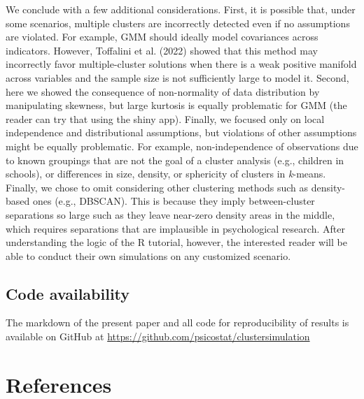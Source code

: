 \documentclass[
  man,floatsintext]{apa6}
\begin{document}
We conclude with a few additional considerations. First, it is possible that, under some scenarios, multiple clusters are incorrectly detected even if no assumptions are violated. For example, GMM should ideally model covariances across indicators. However, Toffalini et al. (2022) showed that this method may incorrectly favor multiple-cluster solutions when there is a weak positive manifold across variables and the sample size is not sufficiently large to model it. Second, here we showed the consequence of non-normality of data distribution by manipulating skewness, but large kurtosis is equally problematic for GMM (the reader can try that using the shiny app). Finally, we focused only on local independence and distributional assumptions, but violations of other assumptions might be equally problematic. For example, non-independence of observations due to known groupings that are not the goal of a cluster analysis (e.g., children in schools), or differences in size, density, or sphericity of clusters in \emph{k}-means. Finally, we chose to omit considering other clustering methods such as density-based ones (e.g., DBSCAN). This is because they imply between-cluster separations so large such as they leave near-zero density areas in the middle, which requires separations that are implausible in psychological research. After understanding the logic of the R tutorial, however, the interested reader will be able to conduct their own simulations on any customized scenario.

\hypertarget{code-availability}{%
\subsection{Code availability}\label{code-availability}}

The markdown of the present paper and all code for reproducibility of results is available on GitHub at \url{https://github.com/psicostat/clustersimulation}

\newpage

\hypertarget{references}{%
\section{References}\label{references}}
\end{document}
